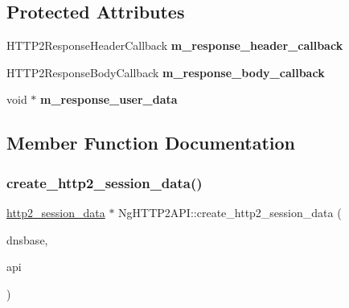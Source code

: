 \subsection*{Protected Attributes}
\begin{DoxyCompactItemize}
\item 
\mbox{\label{classNetwork_1_1HTTP2_1_1NgHTTP2API_aafbb434466a988c7b364fd2359d5a273}} 
H\+T\+T\+P2\+Response\+Header\+Callback {\bfseries m\+\_\+response\+\_\+header\+\_\+callback}
\item 
\mbox{\label{classNetwork_1_1HTTP2_1_1NgHTTP2API_aff09e9e26af77859c94dcdd3d76f8472}} 
H\+T\+T\+P2\+Response\+Body\+Callback {\bfseries m\+\_\+response\+\_\+body\+\_\+callback}
\item 
\mbox{\label{classNetwork_1_1HTTP2_1_1NgHTTP2API_ad8c875a52bbdc2e93707698787998d8d}} 
void $\ast$ {\bfseries m\+\_\+response\+\_\+user\+\_\+data}
\end{DoxyCompactItemize}


\subsection{Member Function Documentation}
\mbox{\label{classNetwork_1_1HTTP2_1_1NgHTTP2API_a83fa51a83722d8aeab16465c937cc41f}} 
\subsubsection{\texorpdfstring{create\+\_\+http2\+\_\+session\+\_\+data()}{create\_http2\_session\_data()}}
{\footnotesize\ttfamily \hyperlink{structNetwork_1_1HTTP2_1_1http2__session__data}{http2\+\_\+session\+\_\+data} $\ast$ Ng\+H\+T\+T\+P2\+A\+P\+I\+::create\+\_\+http2\+\_\+session\+\_\+data (\begin{DoxyParamCaption}\item[{struct evdns\+\_\+base $\ast$}]{dnsbase,  }\item[{\hyperlink{classNetwork_1_1HTTP2_1_1NgHTTP2API}{Ng\+H\+T\+T\+P2\+A\+PI} $\ast$}]{api }\end{DoxyParamCaption})}



